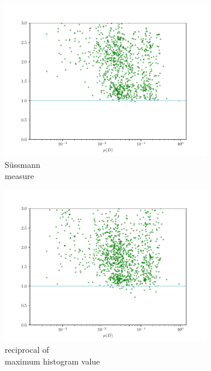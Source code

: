 \documentclass[12pt,a4paper,automark, toc=bib]{scrreprt}
\theoremstyle{definition}
\begin{document}
\begin{figure}
\begin{subfigure}{0.32\linewidth}
			\includegraphics[width=\linewidth]{figures/stat_sha384_0suessmann_div.pdf}
			\caption{Süssmann\\measure}
		\end{subfigure}
		\begin{subfigure}{0.32\linewidth}
			\includegraphics[width=\linewidth]{figures/stat_sha384_0max_hist_inverse_div.pdf}
			\caption{reciprocal of\\maximum histogram value}
		\end{subfigure}
		\begin{subfigure}{0.32\linewidth}

\end{subfigure}
\end{figure}
\end{document}
